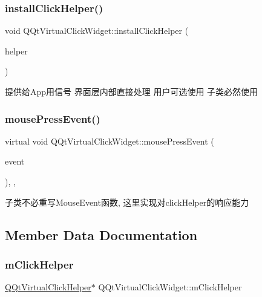 \subsubsection{\texorpdfstring{install\+Click\+Helper()}{installClickHelper()}}
{\footnotesize\ttfamily void Q\+Qt\+Virtual\+Click\+Widget\+::install\+Click\+Helper (\begin{DoxyParamCaption}\item[{\mbox{\hyperlink{class_q_qt_virtual_click_helper}{Q\+Qt\+Virtual\+Click\+Helper}} $\ast$}]{helper }\end{DoxyParamCaption})\hspace{0.3cm}{\ttfamily [inline]}}

提供给\+App用信号 界面层内部直接处理 用户可选使用 子类必然使用 \mbox{\label{class_q_qt_virtual_click_widget_ac0e5a03607e6c28036596fb4b6f709eb}} 
\subsubsection{\texorpdfstring{mouse\+Press\+Event()}{mousePressEvent()}}
{\footnotesize\ttfamily virtual void Q\+Qt\+Virtual\+Click\+Widget\+::mouse\+Press\+Event (\begin{DoxyParamCaption}\item[{Q\+Mouse\+Event $\ast$}]{event }\end{DoxyParamCaption})\hspace{0.3cm}{\ttfamily [inline]}, {\ttfamily [protected]}, {\ttfamily [virtual]}}

子类不必重写\+Mouse\+Event函数, 这里实现对click\+Helper的响应能力 

\subsection{Member Data Documentation}
\mbox{\label{class_q_qt_virtual_click_widget_aba7e163132ae350d10f1bc4f395c7f31}} 
\subsubsection{\texorpdfstring{m\+Click\+Helper}{mClickHelper}}
{\footnotesize\ttfamily \mbox{\hyperlink{class_q_qt_virtual_click_helper}{Q\+Qt\+Virtual\+Click\+Helper}}$\ast$ Q\+Qt\+Virtual\+Click\+Widget\+::m\+Click\+Helper\hspace{0.3cm}{\ttfamily [protected]}}

